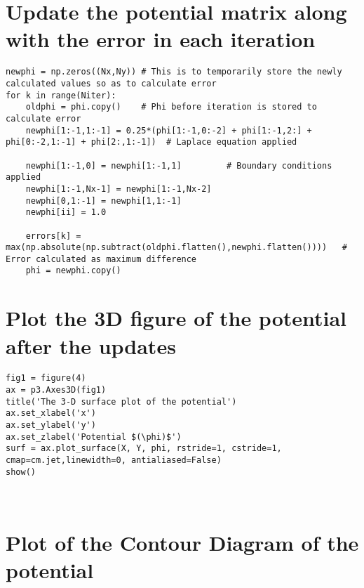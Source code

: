 \documentclass[11pt]{article}
\begin{document}
    \hypertarget{update-the-potential-matrix-along-with-the-error-in-each-iteration}{%
\section{Update the potential matrix along with the error in each
iteration}\label{update-the-potential-matrix-along-with-the-error-in-each-iteration}}

    \begin{Verbatim}
newphi = np.zeros((Nx,Ny)) # This is to temporarily store the newly calculated values so as to calculate error
for k in range(Niter):
    oldphi = phi.copy()    # Phi before iteration is stored to calculate error
    newphi[1:-1,1:-1] = 0.25*(phi[1:-1,0:-2] + phi[1:-1,2:] + phi[0:-2,1:-1] + phi[2:,1:-1])  # Laplace equation applied
    
    newphi[1:-1,0] = newphi[1:-1,1]         # Boundary conditions applied
    newphi[1:-1,Nx-1] = newphi[1:-1,Nx-2]
    newphi[0,1:-1] = newphi[1,1:-1]
    newphi[ii] = 1.0
    
    errors[k] = max(np.absolute(np.subtract(oldphi.flatten(),newphi.flatten())))   # Error calculated as maximum difference
    phi = newphi.copy()
\end{Verbatim}


    \hypertarget{plot-the-3d-figure-of-the-potential-after-the-updates}{%
\section{Plot the 3D figure of the potential after the
updates}\label{plot-the-3d-figure-of-the-potential-after-the-updates}}

    \begin{Verbatim}
fig1 = figure(4)
ax = p3.Axes3D(fig1)
title('The 3-D surface plot of the potential')
ax.set_xlabel('x')
ax.set_ylabel('y')
ax.set_zlabel('Potential $(\phi)$')
surf = ax.plot_surface(X, Y, phi, rstride=1, cstride=1, cmap=cm.jet,linewidth=0, antialiased=False)
show()
\end{Verbatim}


    \begin{center}
    \end{center}
    { \hspace*{\fill} \\}
    
    \hypertarget{plot-of-the-contour-diagram-of-the-potential}{%
\section{Plot of the Contour Diagram of the
potential}\label{plot-of-the-contour-diagram-of-the-potential}}
\end{document}
